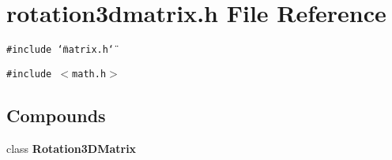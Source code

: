 \section{rotation3dmatrix.h File Reference}
\label{rotation3dmatrix_8h}
{\tt \#include \char`\"{}matrix.h\char`\"{}}\par
{\tt \#include $<$math.h$>$}\par
\subsection*{Compounds}
\begin{CompactItemize}
\item 
class {\bf Rotation3DMatrix}
\end{CompactItemize}
